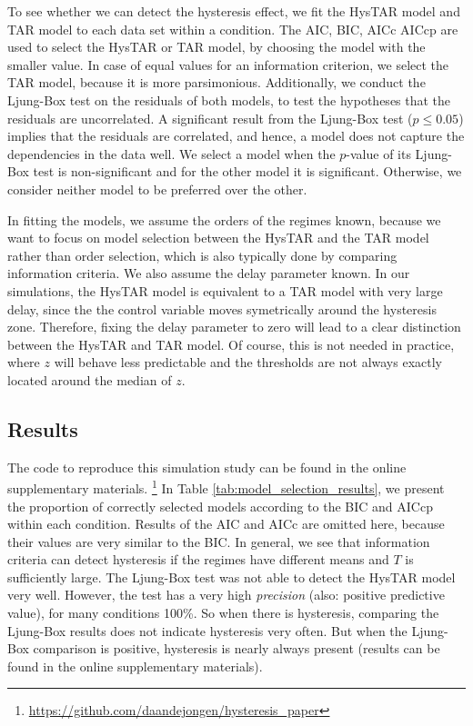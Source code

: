 \documentclass{article}
\begin{document}
To see whether we can detect the hysteresis effect, we fit the HysTAR model and TAR model to each data set within a condition.
The AIC, BIC, AICc AICcp are used to select the HysTAR or TAR model, by choosing the model with the smaller value.
In case of equal values for an information criterion, we select the TAR model, because it is more parsimonious. 
Additionally, we conduct the Ljung-Box test on the residuals of both models, to test the hypotheses that the residuals are uncorrelated.
A significant result from the Ljung-Box test ($p \le 0.05$) implies that the residuals are correlated, and hence, a model does not capture the dependencies in the data well.
We select a model when the $p$-value of its Ljung-Box test is non-significant and for the other model it is significant. Otherwise, we consider neither model to be preferred over the other.

In fitting the models, we assume the orders of the regimes known, because we want to focus on model selection between the HysTAR and the TAR model rather than order selection, which is also typically done by comparing information criteria.
We also assume the delay parameter known. 
In our simulations, the HysTAR model is equivalent to a TAR model with very large delay, since the the control variable moves symetrically around the hysteresis zone.
Therefore, fixing the delay parameter to zero will lead to a clear distinction between the HysTAR and TAR model.
Of course, this is not needed in practice, where $z$ will behave less predictable and the thresholds are not always exactly located around the median of $z$.

\subsection{Results}
\label{sec:model_selection_results}
The code to reproduce this simulation study can be found in the online supplementary materials.
\footnote{\url{https://github.com/daandejongen/hysteresis_paper}}
In Table \ref{tab:model_selection_results}, we present the proportion of correctly selected models according to the BIC and AICcp within each condition. Results of the AIC and AICc are omitted here, because their values are very similar to the BIC. In general, we see that information criteria can detect hysteresis if the regimes have different means and $T$ is sufficiently large.
The Ljung-Box test was not able to detect the HysTAR model very well. However, the test has a very high \textit{precision} (also: positive predictive value), for many conditions 100\%. So when there is hysteresis, comparing the Ljung-Box results does not indicate hysteresis very often. But when the Ljung-Box comparison is positive, hysteresis is nearly always present (results can be found in the online supplementary materials).
\end{document}
